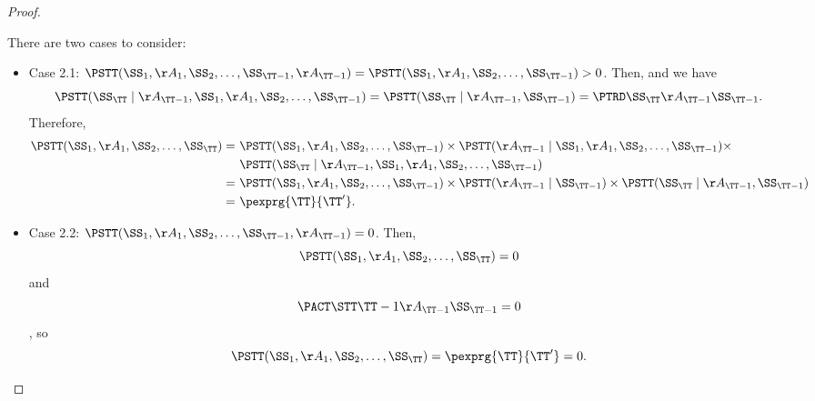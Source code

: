 \begin{proof}
\begin{itemize}
      There are two cases to consider:
      \begin{itemize}
        \item Case 2.1: $\ismid = \isa > 0$.
          Then, 
          and we have
          $$\iscf = \isc = \istrd.$$
          Therefore,
          \begin{align*}
            \isjoint =\ & \isa \times \isbf \times\\& \iscf\\
            =\ & \isa \times \isb \times \isc\\
            =\ & \pexprg{\TT}{\TT'}.
          \end{align*}
        \item Case 2.2: $\ismid = 0$.
          Then,
          $$\isjoint = 0$$
          and
          $$\isact = 0$$,
          so
          $$\isjoint = \pexprg{\TT}{\TT'} = 0.$$
      \end{itemize}
  \end{itemize}
\end{proof}
